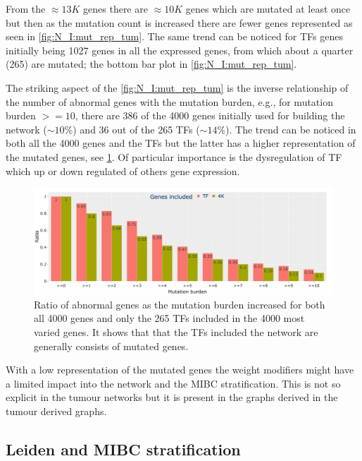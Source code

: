 From the $\approx13K$ genes there are $\approx10K$ genes which are mutated at least once but then as the mutation count is increased there are fewer genes represented as seen in \cref{fig:N_I:mut_rep_tum}. The same trend can be noticed for TFs genes initially being 1027 genes in all the expressed genes, from which about a quarter (265) are mutated; the bottom bar plot in \cref{fig:N_I:mut_rep_tum}.

The striking aspect of the \cref{fig:N_I:mut_rep_tum} is the inverse relationship of the number of abnormal genes with the mutation burden, e.g., for mutation burden $>=10$, there are 386 of the 4000 genes initially used for building the network ($\sim10\%$) and 36 out of the 265 TFs ($\sim14\%$). The trend can be noticed in both all the 4000 genes and the TFs but the latter has a higher representation of the mutated genes, see \cref{fig:N_I:prct_mut_rep_tum}. Of particular importance is the dysregulation of TF which up or down regulated of others gene expression.

\begin{figure}[!htb]    
    \centering
    \includegraphics[width=1.0\textwidth,keepaspectratio]{Sections/Network_I/Resources/Tum_network/MutTF_representation_4K_TF_prct.png}
    \caption{Ratio of abnormal genes as the mutation burden increased for both all 4000 genes and only the 265 TFs included in the 4000 most varied genes. It shows that that the TFs included the network are generally consists of mutated genes.}
    \label{fig:N_I:prct_mut_rep_tum}
\end{figure}

With a low representation of the mutated genes the weight modifiers might have a limited impact into the network and the MIBC stratification. This is not so explicit in the tumour networks but it is present in the graphs derived in the tumour derived graphs.

\subsection{Leiden and MIBC stratification} \label{s:N_I:tum_stratification}

